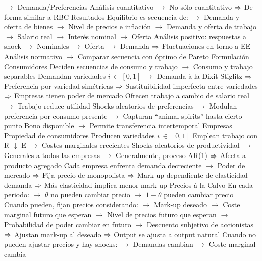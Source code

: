 \documentclass{nuevotema}
\begin{document}
\begin{esquemal}
				\4[] $\to$ Demanda/Preferencias
				\4[] Análisis cuantitativo
				\4[] $\to$ No sólo cuantitativo
				\4[] $\Rightarrow$ De forma similar a RBC
				\4 Resultados
				\4[] Equilibrio es secuencia de:
				\4[] $\to$ Demanda y oferta de bienes
				\4[] $\to$ Nivel de precios e inflación
				\4[] $\to$ Demanda y oferta de trabajo
				\4[] $\to$ Salario real
				\4[] $\to$ Interés nominal
				\4[] $\to$ Oferta
				\4[] Análisis positivo: respuestas a shock
				\4[] $\to$ Nominales
				\4[] $\to$ Oferta
				\4[] $\to$ Demanda
				\4[] $\Rightarrow$ Fluctuaciones en torno a EE
				\4[] Análisis normativo
				\4[] $\to$ Comparar secuencia con óptimo de Pareto
			\3 Formulación
				\4 Consumidores
				\4[] Deciden secuencias de consumo y trabajo
				\4[] $\to$ Consumo y trabajo separables
				\4[] Demandan variedades $i \, \in \, [0,1]$
				\4[] $\to$ Demanda à la Dixit-Stiglitz
				\4[] $\Rightarrow$ Preferencia por variedad simétricas
				\4[] $\Rightarrow$ Sustituibilidad imperfecta entre variedades
				\4[] $\Rightarrow$ Empresas tienen poder de mercado
				\4[] Ofrecen trabajo a cambio de salario real
				\4[] $\to$ Trabajo reduce utilidad
				\4[] Shocks aleatorios de preferencias
				\4[] $\to$ Modulan preferencia por consumo presente
				\4[] $\to$ Capturan ``animal spirits'' hasta cierto punto
				\4[] Bono disponible
				\4[] $\to$ Permite transferencia intertemporal
				\4 Empresas
				\4[] Propiedad de consumidores
				\4[] Producen variedades $i \, \in \, [0,1]$
				\4[] Emplean trabajo con R $\downarrow$ E
				\4[] $\to$ Costes marginales crecientes
				\4[] Shocks aleatorios de productividad
				\4[] $\to$ Generales a todas las empresas
				\4[] $\to$ Generalmente, proceso AR(1)
				\4[] $\Rightarrow$ Afecta a producto agregado
				\4[] Cada empresa enfrenta demanda decreciente
				\4[] $\to$ Poder de mercado
				\4[] $\Rightarrow$ Fija precio de monopolista
				\4[] $\Rightarrow$ Mark-up dependiente de elasticidad demanda
				\4[] $\Rightarrow$ Más elasticidad implica menor mark-up
				\4 Precios à la Calvo
				\4[] En cada periodo:
				\4[] $\to$ $\theta$ no pueden cambiar precio
				\4[] $\to$ $1-\theta$ pueden cambiar precio
				\4[] Cuando pueden, fijan precios considerando:
				\4[] $\to$ Mark-up deseado
				\4[] $\to$ Coste marginal futuro que esperan
				\4[] $\to$ Nivel de precios futuro que esperan
				\4[] $\to$ Probabilidad de poder cambiar en futuro
				\4[] $\to$ Descuento subjetivo de accionistas
				\4[] $\Rightarrow$ Ajustan mark-up al deseado
				\4[] $\Rightarrow$ Output se ajusta a output natural
				\4[] Cuando no pueden ajustar precios y hay shocks:
				\4[] $\to$ Demandas cambian
				\4[] $\to$ Coste marginal cambia

\end{esquemal}
\end{document}
